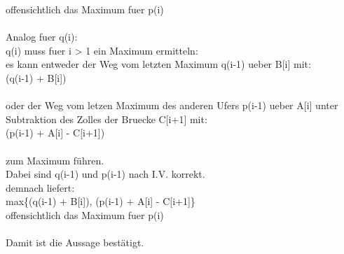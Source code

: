 \documentclass{article}
\begin{document}
offensichtlich das Maximum fuer p(i)\\
\\
Analog fuer q(i):\\
q(i) muss fuer i > 1 ein Maximum ermitteln:\\
es kann entweder der Weg vom letzten Maximum q(i-1) ueber
B[i] mit:\\
(q(i-1) + B[i])\\
\\
oder der Weg vom letzen Maximum des anderen Ufers p(i-1) ueber
A[i] unter Subtraktion des Zolles der Bruecke C[i+1] mit:\\
(p(i-1) + A[i] - C[i+1])\\
\\
zum Maximum führen.\\
Dabei sind q(i-1) und p(i-1) nach I.V. korrekt.\\
demnach liefert:\\
max\{(q(i-1) + B[i]), (p(i-1) + A[i] - C[i+1]\}\\
offensichtlich das Maximum fuer p(i)\\
\\
Damit ist die Aussage bestätigt.
\end{document}
